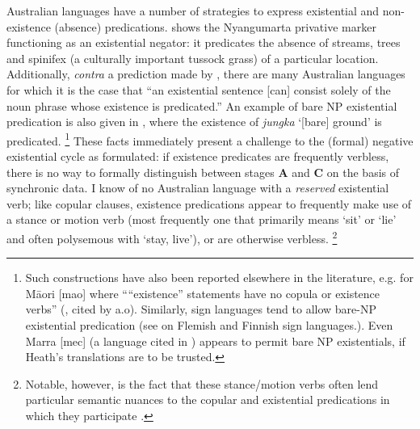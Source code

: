 \documentclass[output=paper,draft,draftmode,colorlinks,citecolor=brown]{langscibook}
\begin{document}
\newpage
Australian languages have a number of strategies to express existential and
non-existence (absence) predications.
         shows the Nyangumarta
privative marker functioning as an existential negator: it
predicates the absence of streams, trees and spinifex (a culturally
important tussock grass) of a particular location. Additionally,
\textit{contra} a prediction made by \citet[19]{Croft1991}, there
are many Australian languages for which it is the case that ``an
existential sentence [can] consist solely of the noun phrase whose
existence is predicated.'' An example of bare NP existential
predication is also given in
, where the existence of
\textit{jungka} `[bare] ground' is predicated.%
%
\footnote{Such constructions have also been reported elsewhere in the
        literature, e.g. for Māori [mao] where ``{}``existence'' statements
        have no copula or existence verbs'' (\citealt[78]{Bauer1993}, cited
        by \citealp{ChungLadusaw2004} a.o). Similarly, sign languages tend
        to allow bare-NP existential predication (see
        \citealt[26ff]{deWeert2016} on Flemish and Finnish sign
        languages.). Even Marra [mec] (a language cited in \citealt[14]{Croft1991}) appears to permit bare NP existentials, if Heath's \citeyearpar[364]{Heath1981} translations are to be trusted.}
 These facts immediately present a challenge to the (formal) negative
        existential cycle as formulated: if existence predicates are
        frequently verbless, there is no way to formally distinguish
        between stages \textbf{A} and \textbf{C} on the basis of synchronic
        data. I know of no Australian language with a \textit{reserved}
        existential verb; like copular clauses, existence predications
        appear to frequently make use of a stance or motion verb (most
        frequently one that primarily means `sit' or `lie' and often
        polysemous with `stay, live'), or are otherwise verbless.%
\footnote{Notable, however, is the fact that these stance\slash motion verbs
often lend particular semantic nuances to the copular and existential
predications in which they participate \citep[see e.g.][610--611]{Wilkinson1991}.}
\end{document}
